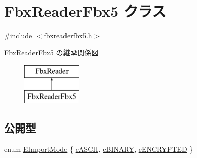 \hypertarget{class_fbx_reader_fbx5}{}\section{Fbx\+Reader\+Fbx5 クラス}
\label{class_fbx_reader_fbx5}


{\ttfamily \#include $<$fbxreaderfbx5.\+h$>$}

Fbx\+Reader\+Fbx5 の継承関係図\begin{figure}[H]
\begin{center}
\leavevmode
\includegraphics[height=2.000000cm]{class_fbx_reader_fbx5}
\end{center}
\end{figure}
\subsection*{公開型}
\begin{DoxyCompactItemize}
\item 
enum \hyperlink{class_fbx_reader_fbx5_a9d205ec64b33007dd74af093943b50c5}{E\+Import\+Mode} \{ \hyperlink{class_fbx_reader_fbx5_a9d205ec64b33007dd74af093943b50c5ad5ec6aa189d4f8dd1c0f74907b72d800}{e\+A\+S\+C\+II}, 
\hyperlink{class_fbx_reader_fbx5_a9d205ec64b33007dd74af093943b50c5ae11f33f94eb2bd6ea602deab3bc7cb6f}{e\+B\+I\+N\+A\+RY}, 
\hyperlink{class_fbx_reader_fbx5_a9d205ec64b33007dd74af093943b50c5a1a218e22b2c3355b99c5b68f73959c26}{e\+E\+N\+C\+R\+Y\+P\+T\+ED}
 \}
\end{DoxyCompactItemize}
